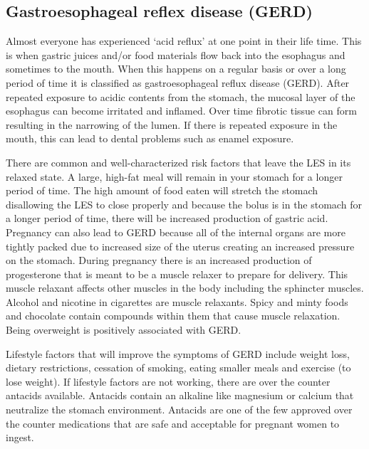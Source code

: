 \documentclass{tufte-handout}
\begin{document}
\subsection{Gastroesophageal reflex disease (GERD)}
Almost everyone has experienced ‘acid reflux' at one point in their life time. This is when gastric juices and/or food materials flow back into the esophagus and sometimes to the mouth. When this happens on a regular basis or over a long period of time it is classified as gastroesophageal reflux disease (GERD). After repeated exposure to acidic contents from the stomach, the mucosal layer of the esophagus can become irritated and inflamed. Over time fibrotic tissue can form resulting in the narrowing of the lumen. If there is repeated exposure in the mouth, this can lead to dental problems such as enamel exposure. 

 There are common and well-characterized risk factors that leave the LES in its relaxed state. A large, high-fat meal will remain in your stomach for a longer period of time. The high amount of food eaten will stretch the stomach disallowing the LES to close properly and because the bolus is in the stomach for a longer period of time, there will be increased production of gastric acid. Pregnancy can also lead to GERD because all of the internal organs are more tightly packed due to increased size of the uterus creating an increased pressure on the stomach. During pregnancy there is an increased production of progesterone that is meant to be a muscle relaxer to prepare for delivery. This muscle relaxant affects other muscles in the body including the sphincter muscles. Alcohol and nicotine in cigarettes are muscle relaxants. Spicy and minty foods and chocolate contain compounds within them that cause muscle relaxation. Being overweight is positively associated with GERD. 

 Lifestyle factors that will improve the symptoms of GERD include weight loss, dietary restrictions, cessation of smoking, eating smaller meals and exercise (to lose weight). If lifestyle factors are not working, there are over the counter antacids available. Antacids contain an alkaline like magnesium or calcium that neutralize the stomach environment. Antacids are one of the few approved over the counter medications that are safe and acceptable for pregnant women to ingest.
\end{document}
